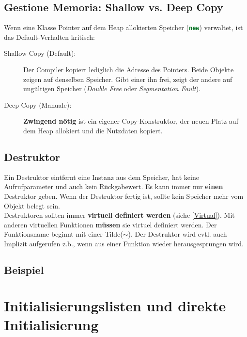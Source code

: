 \subsection{Gestione Memoria: Shallow vs. Deep Copy}

Wenn eine Klasse Pointer auf dem Heap allokierten Speicher (\lstinline[language=C++]|new|) verwaltet, ist das Default-Verhalten kritisch:

\begin{description}
    \item[Shallow Copy (Default):] Der Compiler kopiert lediglich die Adresse des Pointers. 
    Beide Objekte zeigen auf denselben Speicher. Gibt einer ihn frei, zeigt der andere auf ungültigen Speicher (\textit{Double Free} oder \textit{Segmentation Fault}).
    \item[Deep Copy (Manuale):] \textbf{\color{red}Zwingend nötig} ist ein eigener Copy-Konstruktor, der neuen Platz auf dem Heap allokiert und die Nutzdaten kopiert.
\end{description}

\subsection{Destruktor}

Ein Destruktor eintfernt eine Instanz aus dem Speicher, 
hat keine Aufrufparameter und auch kein Rückgabewert.
Es kann immer nur \textbf{einen} Destruktor geben. 
Wenn der Destruktor fertig ist, sollte kein Speicher mehr vom Objekt belegt sein.\\
Destruktoren sollten immer \textbf{virtuell definiert werden} (siehe \ref{Virtual}). 
Mit anderen virtuellen Funktionen \textbf{müssen} sie virtuel definiert werden. 
Der Funktionsname beginnt mit einer Tilde($\sim$). 
Der Destruktor wird evtl. auch Implizit aufgerufen z.b., wenn aus einer Funktion wieder herausgesprungen wird.

\subsection{Beispiel}\label{chap:ctor_dtor_example}



\section{Initialisierungslisten und direkte Initialisierung}

